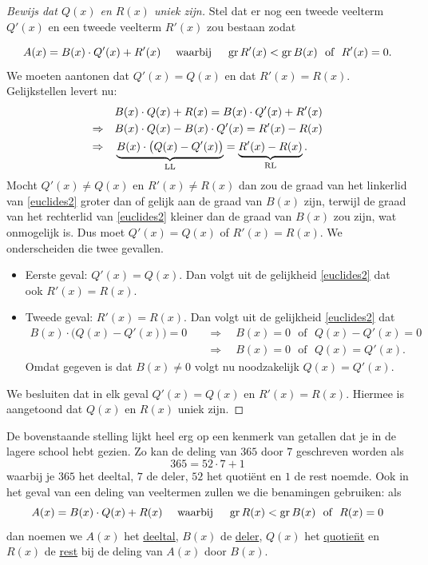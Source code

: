 \documentclass{ximera}
\begin{document}
\begin{proof}[Bewijs dat $Q(x)$ en $R(x)$ uniek zijn] Stel dat er nog een tweede veelterm $Q'(x)$ en een tweede veelterm $R'(x)$ zou bestaan zodat

\[
A(x) = B(x)\cdot Q'(x) + R'(x) \quad \text{ waarbij } \quad \operatorname{gr} R'(x) < \operatorname{gr} B(x) \,\, \text{ of } \,\, R'(x) = 0.
\]
We moeten aantonen dat $Q'(x) = Q(x)$ en dat $R'(x) = R(x)$. Gelijkstellen levert nu:
\begin{align}
& B(x) \cdot Q(x) + R(x) = B(x) \cdot Q'(x) + R'(x) \notag \\
\Rightarrow \quad & B(x) \cdot Q(x) - B(x) \cdot Q'(x) = R'(x) - R(x) \notag \\
\Rightarrow \quad & \underbrace{B(x) \cdot \bigl(Q(x) - Q'(x)\bigr)}_{\text{LL}} = \underbrace{R'(x) - R(x)}_{\text{RL}}. \label{euclides2}
\end{align}
Mocht $Q'(x) \neq Q(x)$ en $R'(x) \neq R(x)$ dan zou de graad van het linkerlid van \eqref{euclides2} groter dan of gelijk aan de graad van $B(x)$ zijn, terwijl de graad van het rechterlid van \eqref{euclides2} kleiner dan de graad van $B(x)$ zou zijn, wat onmogelijk is. Dus moet $Q'(x) = Q(x)$ of $R'(x) = R(x)$. We onderscheiden die twee gevallen.
\begin{itemize}
\item[]
Eerste geval: $Q'(x) = Q(x)$. Dan volgt uit de gelijkheid \eqref{euclides2} dat ook $R'(x) = R(x)$.  
\item[]
Tweede geval: $R'(x) = R(x)$. Dan volgt uit de gelijkheid \eqref{euclides2} dat
\begin{align*}
B(x) \cdot \bigl(Q(x) - Q'(x)\bigr) = 0 \quad 
& \Rightarrow \quad B(x) = 0 \,\, \text{ of } \,\, Q(x) - Q'(x) = 0 \\
& \Rightarrow \quad B(x) = 0 \,\, \text{ of } \,\, Q(x) = Q'(x). 
\end{align*}
Omdat gegeven is dat $B(x) \neq 0$ volgt nu noodzakelijk $Q(x) = Q'(x)$.
\end{itemize}
We besluiten dat in elk geval $Q'(x) = Q(x)$ en $R'(x) = R(x)$. Hiermee is aangetoond dat $Q(x)$ en $R(x)$ uniek zijn. 

\end{proof}


De bovenstaande stelling lijkt heel erg op een kenmerk van getallen dat je in de lagere school hebt gezien. Zo kan de deling van $365$ door $7$ geschreven worden als
\[
365 = 52 \cdot 7 + 1
\]
waarbij je $365$ het deeltal, $7$ de deler, $52$ het quoti\"ent en $1$ de rest noemde. Ook in het geval van een deling van veeltermen zullen we die benamingen gebruiken: als
\[
A(x) = B(x)\cdot Q(x) + R(x) \quad \text{ waarbij } \quad \operatorname{gr} R(x) < \operatorname{gr} B(x) \,\, \text{ of } \,\, R(x) = 0
\]
dan noemen we $A(x)$ het \underline{deeltal}, $B(x)$ de \underline{deler}, $Q(x)$ het \underline{quotie\"nt} en $R(x)$ de \underline{rest} bij de deling van $A(x)$ door $B(x)$. 
\end{document}
